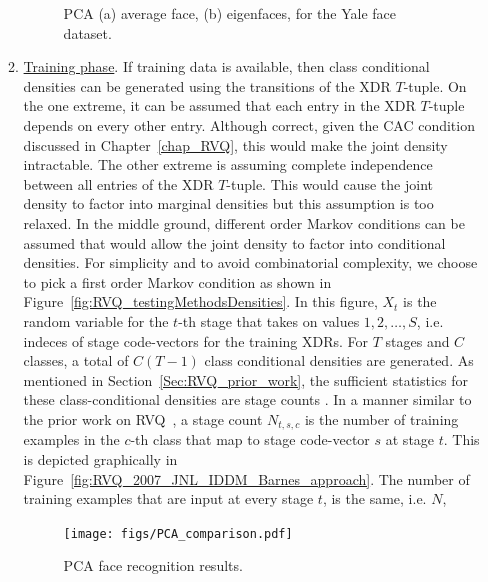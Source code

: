 \begin{Body}
\begin{enumerate}
\begin{enumerate}
											\begin{figure}[t]
											\centering
											\caption{PCA (a) average face, (b) eigenfaces, for the Yale face dataset.}
											\label{fig:PCA_eigenfaces_Yale}
											\end{figure}

\item \underline{Training phase}.  If training data is available, then class conditional densities can be generated using the transitions of the XDR $T$-tuple.  On the one extreme, it can be assumed that each entry in the XDR $T$-tuple depends on every other entry.  Although correct, given the CAC condition discussed in Chapter~\ref{chap_RVQ}, this would make the joint density intractable.  The other extreme is assuming complete independence between all entries of the XDR $T$-tuple.  This would cause the joint density to factor into marginal densities but this assumption is too relaxed.  In the middle ground, different order Markov conditions can be assumed that would allow the joint density to factor into conditional densities.  For simplicity and to avoid combinatorial complexity, we choose to pick a first order Markov condition as shown in Figure~\ref{fig:RVQ_testingMethodsDensities}.  In this figure, $X_t$ is the random variable for the $t$-th stage that takes on values $1, 2, \ldots, S$, i.e. indeces of stage code-vectors for the training XDRs.  For $T$ stages and $C$ classes, a total of $C(T-1)$ class conditional densities are generated.  As mentioned in Section~\ref{Sec:RVQ_prior_work}, the sufficient statistics for these class-conditional densities are stage counts \cite{1993_BOOK_SSP_Kay}.  In a manner similar to the prior work on RVQ~\cite{2007_JNL_Katrina_Barnes, 2007_JNL_IDDM_Barnes}, a stage count $N_{t,s,c}$ is the number of training examples in the $c$-th class that map to stage code-vector $s$ at stage $t$.  This is depicted graphically in Figure~\ref{fig:RVQ_2007_JNL_IDDM_Barnes_approach}.  The number of training examples that are input at every stage $t$,  is the same, i.e. $N$,

											\begin{figure}[t]
											\center
											\texttt{[image: figs/PCA\_comparison.pdf]}
											\caption{PCA face recognition results.}
											\label{fig:PCA_yaleface_results}
											\end{figure}



\end{enumerate}
\end{enumerate}
\end{Body}
